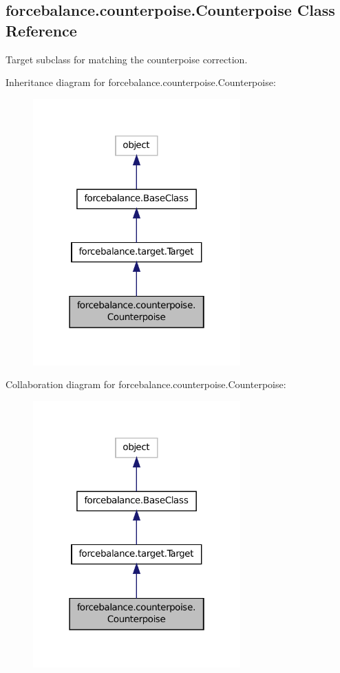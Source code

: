 \hypertarget{classforcebalance_1_1counterpoise_1_1Counterpoise}{\subsection{forcebalance.\-counterpoise.\-Counterpoise Class Reference}
\label{classforcebalance_1_1counterpoise_1_1Counterpoise}
}


Target subclass for matching the counterpoise correction.  




Inheritance diagram for forcebalance.\-counterpoise.\-Counterpoise\-:\nopagebreak
\begin{figure}[H]
\begin{center}
\leavevmode
\includegraphics[width=226pt]{classforcebalance_1_1counterpoise_1_1Counterpoise__inherit__graph}
\end{center}
\end{figure}


Collaboration diagram for forcebalance.\-counterpoise.\-Counterpoise\-:\nopagebreak
\begin{figure}[H]
\begin{center}
\leavevmode
\includegraphics[width=226pt]{classforcebalance_1_1counterpoise_1_1Counterpoise__coll__graph}
\end{center}
\end{figure}
